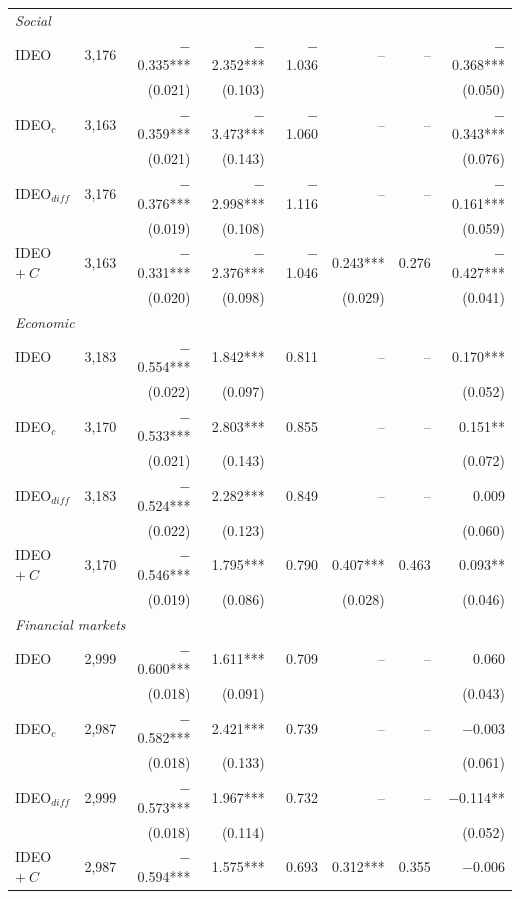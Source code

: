 \begin{table}[ht]
{\begin{tabular}{lrrrrrrr}
\multicolumn{8}{l}{\emph{Social}} \\
\quad IDEO & 3,176 & $-$0.335*** & $-$2.352*** & $-$1.036 & -- & -- & $-$0.368*** \\
 & & (0.021) & (0.103) & &  & & (0.050) \\
\quad IDEO$_{c}$ & 3,163 & $-$0.359*** & $-$3.473*** & $-$1.060 & -- & -- & $-$0.343*** \\
 & & (0.021) & (0.143) & &  & & (0.076) \\
\quad IDEO$_{diff}$ & 3,176 & $-$0.376*** & $-$2.998*** & $-$1.116 & -- & -- & $-$0.161*** \\
 & & (0.019) & (0.108) & &  & & (0.059) \\
\quad IDEO $+\ C$ & 3,163 & $-$0.331*** & $-$2.376*** & $-$1.046 & 0.243*** & 0.276 & $-$0.427*** \\
 & & (0.020) & (0.098) & & (0.029) & & (0.041) \\
\multicolumn{8}{l}{\emph{Economic}} \\
\quad IDEO & 3,183 & $-$0.554*** & 1.842*** & 0.811 & -- & -- & 0.170*** \\
 & & (0.022) & (0.097) & &  & & (0.052) \\
\quad IDEO$_{c}$ & 3,170 & $-$0.533*** & 2.803*** & 0.855 & -- & -- & 0.151** \\
 & & (0.021) & (0.143) & &  & & (0.072) \\
\quad IDEO$_{diff}$ & 3,183 & $-$0.524*** & 2.282*** & 0.849 & -- & -- & 0.009 \\
 & & (0.022) & (0.123) & &  & & (0.060) \\
\quad IDEO $+\ C$ & 3,170 & $-$0.546*** & 1.795*** & 0.790 & 0.407*** & 0.463 & 0.093** \\
 & & (0.019) & (0.086) & & (0.028) & & (0.046) \\
\multicolumn{8}{l}{\emph{Financial markets}} \\
\quad IDEO & 2,999 & $-$0.600*** & 1.611*** & 0.709 & -- & -- & 0.060 \\
 & & (0.018) & (0.091) & &  & & (0.043) \\
\quad IDEO$_{c}$ & 2,987 & $-$0.582*** & 2.421*** & 0.739 & -- & -- & $-$0.003 \\
 & & (0.018) & (0.133) & &  & & (0.061) \\
\quad IDEO$_{diff}$ & 2,999 & $-$0.573*** & 1.967*** & 0.732 & -- & -- & $-$0.114** \\
 & & (0.018) & (0.114) & &  & & (0.052) \\
\quad IDEO $+\ C$ & 2,987 & $-$0.594*** & 1.575*** & 0.693 & 0.312*** & 0.355 & $-$0.006 \\

\end{tabular}}
\end{table}
